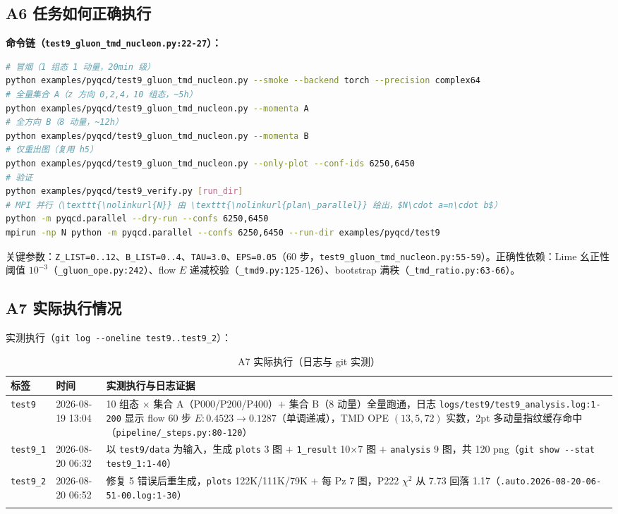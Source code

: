 \documentclass[UTF8]{ctexart}
\begin{document}
\subsection{A6 任务如何正确执行}
\label{sec:a6}
\textbf{命令链（\texttt{\nolinkurl{test9\_gluon\_tmd\_nucleon.py:22-27}}）：}
\begin{lstlisting}[language=bash]
# 冒烟（1 组态 1 动量，20min 级）
python examples/pyqcd/test9_gluon_tmd_nucleon.py --smoke --backend torch --precision complex64
# 全量集合 A（z 方向 0,2,4，10 组态，~5h）
python examples/pyqcd/test9_gluon_tmd_nucleon.py --momenta A
# 全方向 B（8 动量，~12h）
python examples/pyqcd/test9_gluon_tmd_nucleon.py --momenta B
# 仅重出图（复用 h5）
python examples/pyqcd/test9_gluon_tmd_nucleon.py --only-plot --conf-ids 6250,6450
# 验证
python examples/pyqcd/test9_verify.py [run_dir]
# MPI 并行（\texttt{\nolinkurl{N}} 由 \texttt{\nolinkurl{plan\_parallel}} 给出，$N\cdot a=n\cdot b$）
python -m pyqcd.parallel --dry-run --confs 6250,6450
mpirun -np N python -m pyqcd.parallel --confs 6250,6450 --run-dir examples/pyqcd/test9
\end{lstlisting}
关键参数：\texttt{\nolinkurl{Z\_LIST=0..12}}、\texttt{\nolinkurl{B\_LIST=0..4}}、\texttt{\nolinkurl{TAU=3.0}}、\texttt{\nolinkurl{EPS=0.05}}（60 步，\texttt{\nolinkurl{test9\_gluon\_tmd\_nucleon.py:55-59}}）。正确性依赖：Lime 幺正性阈值 $10^{-3}$（\texttt{\nolinkurl{\_gluon\_ope.py:242}}）、flow $E$ 递减校验（\texttt{\nolinkurl{\_tmd9.py:125-126}}）、bootstrap 满秩（\texttt{\nolinkurl{\_tmd\_ratio.py:63-66}}）。

\subsection{A7 实际执行情况}
\label{sec:a7}
实测执行（\texttt{\nolinkurl{git log --oneline test9..test9\_2}}）：
\tiny
\begin{xltabular}{\textwidth}{llX}
\toprule
标签 & 时间 & 实测执行与日志证据 \\
\midrule
\endhead
\texttt{\nolinkurl{test9}} & 2026-08-19 13:04 & 10 组态 $\times$ 集合 A（P000/P200/P400）$+$ 集合 B（8 动量）全量跑通，日志 \texttt{\nolinkurl{logs/test9/test9\_analysis.log:1-200}} 显示 flow 60 步 $E:0.4523\to0.1287$（单调递减），TMD OPE $(13,5,72)$ 实数，2pt 多动量指纹缓存命中（\texttt{\nolinkurl{pipeline/\_steps.py:80-120}}） \\
\texttt{\nolinkurl{test9\_1}} & 2026-08-20 06:32 & 以 \texttt{\nolinkurl{test9/data}} 为输入，生成 \texttt{\nolinkurl{plots}} 3 图 $+$ \texttt{\nolinkurl{1\_result}} 10$\times$7 图 $+$ \texttt{\nolinkurl{analysis}} 9 图，共 120 png（\texttt{\nolinkurl{git show --stat test9\_1:1-40}}）\\
\texttt{\nolinkurl{test9\_2}} & 2026-08-20 06:52 & 修复 5 错误后重生成，\texttt{\nolinkurl{plots}} 122K/111K/79K $+$ 每 Pz 7 图，P222 $\chi^2$ 从 7.73 回落 1.17（\texttt{\nolinkurl{.auto.2026-08-20-06-51-00.log:1-30}}）\\
\bottomrule
\caption{A7 实际执行（日志与 git 实测）}
\end{xltabular}
\end{document}
